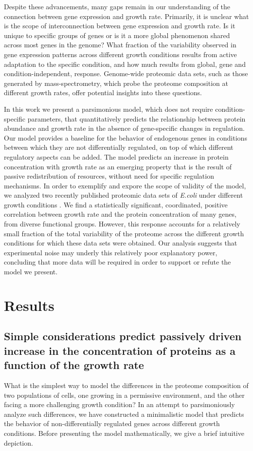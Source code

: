 \documentclass[a4paper]{article}
\begin{document}
Despite these advancements, many gaps remain in our understanding of the connection between gene expression and growth rate.
Primarily, it is unclear what is the scope of interconnection between gene expression and growth rate.
Is it unique to specific groups of genes or is it a more global phenomenon shared across most genes in the genome?
What fraction of the variability observed in gene expression patterns across different growth conditions results from active adaptation to the specific condition, and how much results from global, gene and condition-independent, response.
Genome-wide proteomic data sets, such as those generated by mass-spectrometry, which probe the proteome composition at different growth rates, offer potential insights into these questions.

In this work we present a parsimonious model, which does not require condition-specific parameters, that quantitatively predicts the relationship between protein abundance and growth rate in the absence of gene-specific changes in regulation.
Our model provides a baseline for the behavior of endogenous genes in conditions between which they are not differentially regulated, on top of which different regulatory aspects can be added.
The model predicts an increase in protein concentration with growth rate as an emerging property that is the result of passive redistribution of resources, without need for specific regulation mechanisms.
In order to exemplify and expore the scope of validity of the model, we analyzed two recently published proteomic data sets of \emph{E.coli} under different growth conditions \cite{Valgepea2013,Heinemann2015}.
We find a statistically significant, coordinated, positive correlation between growth rate and the protein concentration of many genes, from diverse functional groups.
However, this response accounts for a relatively small fraction of the total variability of the proteome across the different growth conditions for which these data sets were obtained.
Our analysis suggests that experimental noise may underly this relatively poor explanatory power, concluding that more data will be required in order to support or refute the model we present.


\section{Results}

\subsection{Simple considerations predict passively driven increase in the concentration of proteins as a function of the growth rate}
What is the simplest way to model the differences in the proteome composition of two populations of cells, one growing in a permissive environment, and the other facing a more challenging growth condition?
In an attempt to parsimoniously analyze such differences, we have constructed a minimalistic model that predicts the behavior of non-differentially regulated genes across different growth conditions.
Before presenting the model mathematically, we give a brief intuitive depiction.
\end{document}
